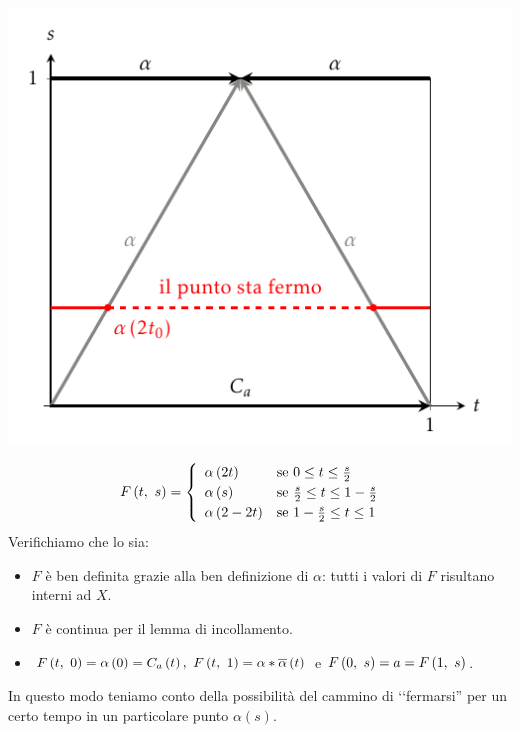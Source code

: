 \begin{demonstration}
\begin{enumerate}[label=\Roman*]
\begin{minipage}{.62\linewidth}
\end{minipage}
\begin{minipage}{.37\linewidth}
	\includegraphics[trim=0cm 0cm 0cm 0cm,clip,scale=0.6]{images/camminoinverso.pdf}
\end{minipage}
\begin{equation}
	F\left(t,\ s\right)=\begin{cases}
		\begin{array}{ll}
			\alpha\left(2t\right)&\text{se }0\leq t\leq \frac{s}{2}\\
			\alpha\left(s\right)&\text{se }\frac{s}{2}\leq t\leq 1-\frac{s}{2}\\
			\alpha\left(2-2t\right)&\text{se }1-\frac{s}{2}\leq t\leq 1
		\end{array}
	\end{cases}
\end{equation}
Verifichiamo che lo sia:
\begin{itemize}
\item $F$ è ben definita grazie alla ben definizione di $\alpha$: tutti i valori di $F$ risultano interni ad $X$.
\item $F$ è continua per il lemma di incollamento.
\item $\mvf{F}{t}{0}=\alpha\left(0\right)=C_a\left(t\right),\ \mvf{F}{t}{1}=\alpha\ast\overline{\alpha}\left(t\right)$ e $F\left(0,\ s\right)=a=F\left(1,\ s\right)$.
\end{itemize}
In questo modo teniamo conto della possibilità del cammino di ‘‘fermarsi'' per un certo tempo in un particolare punto $\alpha\left(s\right)$. 
\end{enumerate}
\end{demonstration}
